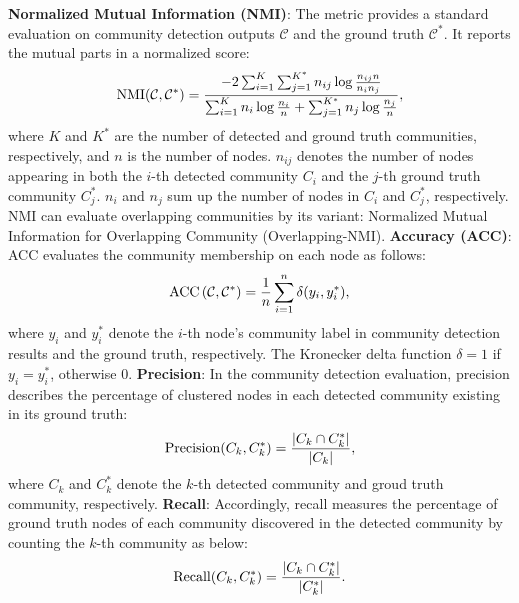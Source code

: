 \label{sec-EM}
\noindent
\textbf{Normalized Mutual Information (NMI)}: The metric provides a standard evaluation on community detection outputs $\mathcal{C}$ and the ground truth $\mathcal{C^{*}}$. It reports the mutual parts in a normalized score:
\begin{equation}
\small
\operatorname{NMI}(\mathcal{C}, \mathcal{C^{*}})=\frac{-2 \sum_{i=1}^{K} \sum_{j=1}^{K^{*}} n_{i j} \log \frac{n_{i j} n}{n_{i} n_{j}}}{\sum_{i=1}^{K} n_{i} \log \frac{n_{i}}{n}+\sum_{j=1}^{K^{*}} n_{j} \log \frac{n_{j}}{n}},
\end{equation}
where $K$ and $K^{*}$ are the number of detected and ground truth communities, respectively, and $n$ is the number of nodes. $n_{ij}$ denotes the number of nodes appearing in both the $i$-th detected community $C_{i}$ and the $j$-th ground truth community $C_{j}^{*}$. $n_{i}$ and $n_{j}$ sum up the number of nodes in $C_{i}$ and $C_{j}^{*}$, respectively. NMI can evaluate overlapping communities by its variant: Normalized Mutual Information for Overlapping Community (Overlapping-NMI).
\vspace{2mm}
\noindent	
\textbf{Accuracy (ACC)}: ACC evaluates the community membership on each node as follows:
\begin{equation}
\small
\operatorname{ACC}\left(\mathcal{C}, \mathcal{C^{*}} \right) = \frac{1}{n}\sum_{i=1}^{n}\delta(y_{i},y_{i}^{*}), 
\end{equation}
where $y_{i}$ and $y_{i}^{*}$ denote the $i$-th node's community label in community detection results and the ground truth, respectively. The Kronecker delta function $\delta = 1$ if $y_{i}=y_{i}^{*}$, otherwise $0$.
\vspace{2mm}
\noindent
\textbf{Precision}: In the community detection evaluation, precision describes the percentage of clustered nodes in each detected community existing in its ground truth:
\begin{equation}
\small
\operatorname{Precision}(C_{k}, C^*_{k})= \frac{|C_k \cap C^*_k|} {|C_k|}, 
\end{equation}
where $C_k$ and $C_k^*$ denote the $k$-th detected community and groud truth community, respectively.
\vspace{2mm}
\noindent
\textbf{Recall}: Accordingly, recall measures the percentage of ground truth nodes of each community discovered in the detected community by counting the $k$-th community as below: 
\begin{equation}
\small
\operatorname{Recall}(C_{k}, C^*_{k}) = \frac{|C_k \cap C^*_k|} {|C_k^*|}. 
\end{equation}
